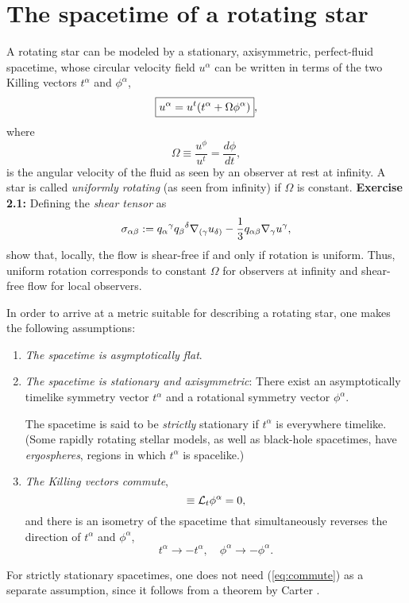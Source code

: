 \documentclass[12pt]{article}
\def\d{\delta}
\def\a{\alpha}
\def\b{\beta}
\def\g{\gamma}
\def\be{\begin{equation}}
\def\ee{\end{equation}}
\newcommand{\na}{\nabla}
\def\a{\alpha}
\def\b{\beta}
\def\d{\delta}
\begin{document}
\section{The spacetime of a rotating star}
\label{sec:spacerot}

A rotating star can be modeled by a stationary, axisymmetric,
perfect-fluid spacetime, whose circular velocity field $u^\alpha$ can be
written in terms of the two Killing vectors $t^\alpha$ and
$\phi^\alpha$,
\begin{equation}
     \boxed{u^\alpha = u^t (t^\alpha + \Omega \phi^\alpha)},
\label{fourvel}\index{velocity!rotating star}\index{rotating stars!velocity}
\end{equation}
where  
\be 
\boxed{\Omega\equiv \frac{u^\phi}{u^t}= \frac{d\phi}{dt}},
\label{eq:Omega} \ee 
is the angular velocity of the fluid as seen by an observer at
rest at infinity.  A star is  called {\it
uniformly rotating} (as seen from infinity) if $\Omega$ is constant.  
\vskip0.4cm
\textbf{Exercise 2.1:} Defining the \textit{shear tensor} as 
\be
\displaystyle
\sigma_{\alpha\beta} := q_\a{}^\g q_\b{}^\d \na_{(\g}u_{\d)}-\frac13 q_{\a\b}\na_\g u^\g, 
\label{eq:shear}\index{shear|textbf}\ee 
show that, locally, the flow is shear-free if and only if rotation
is uniform.
Thus, uniform rotation corresponds to constant $\Omega$ for observers at infinity and shear-free flow for local observers. 

\vskip0.8cm

In order to arrive at a metric suitable for describing a rotating star, one makes the following assumptions:
\begin{enumerate}
\item
\textit{The spacetime is asymptotically flat}.
\item \textit{The spacetime is stationary and axisymmetric}:
There exist an asymptotically timelike symmetry vector $t^\alpha$
and a rotational symmetry vector $\phi^\alpha$.

The spacetime is
said to be {\it strictly} stationary if $t^\alpha$ is everywhere
timelike. (Some rapidly rotating stellar models, as well as
black-hole spacetimes, have {\it ergospheres}, regions in which
$t^\alpha$ is spacelike.)

\item  \textit{The Killing vectors commute}, 
\be
        [t, \phi]\equiv {\cal L}_t \phi^\alpha =0,
\label{eq:commute}\ee
and there is an isometry of the spacetime that simultaneously
reverses the direction of $t^\alpha$ and $\phi^\alpha$,
\be
 t^\alpha\rightarrow -t^\alpha,\quad \phi^\alpha \rightarrow - \phi^\alpha.
\label{eq:isometry} \ee
%
\end{enumerate}
%
For strictly stationary spacetimes, one does not need
(\ref{eq:commute}) as a separate assumption, since it  follows from a theorem by
Carter \cite{Carter70}.
\end{document}

